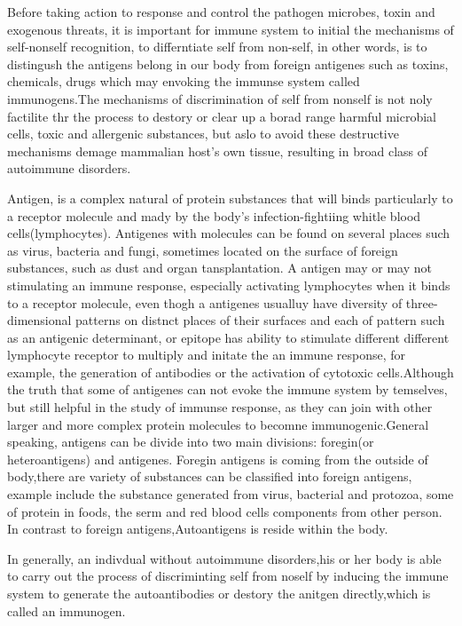 \documentclass[12pt]{article}
\begin{document}
Before taking action to response and control the pathogen microbes, toxin and exogenous threats, it is important for immune system to initial the mechanisms of self-nonself recognition, to differntiate self from non-self, in other words, is to distingush the antigens belong in our body from foreign antigenes such as toxins, chemicals, drugs which may envoking the immunse system called immunogens.The mechanisms of discrimination of self from nonself is not noly factilite thr the process to destory  or clear up a borad range harmful microbial cells, toxic and allergenic substances, but aslo to avoid these destructive mechanisms demage mammalian host's own tissue, resulting in broad class of autoimmune disorders.\medskip


Antigen, is a complex natural of protein substances that will binds particularly to a receptor molecule and mady by the body's infection-fightiing whitle blood cells(lymphocytes). Antigenes with molecules can be found on several places such as virus, bacteria and fungi, sometimes located on the surface of foreign substances, such as dust and organ tansplantation. A antigen may or may not stimulating an immune response, especially activating lymphocytes when it binds to a receptor molecule, even thogh a antigenes usualluy have diversity of three-dimensional patterns on distnct places of  their surfaces and each of pattern such as an antigenic determinant, or epitope has ability to stimulate different different lymphocyte receptor to  multiply and initate the an immune response, for example, the generation of antibodies or the activation of cytotoxic cells.Although the truth that some of antigenes can not evoke the immune system by temselves, but still helpful in the study of immunse response, as they can join with other larger and more complex  protein molecules to becomne immunogenic.General speaking, antigens can be divide into two main divisions: foregin(or heteroantigens) and antigenes.
Foregin antigens is coming from the outside of body,there are variety of substances can be classified into foreign antigens, example include the substance generated from virus, bacterial and protozoa, some of protein in foods, the serm and red blood cells components from other person. In contrast to foreign antigens,Autoantigens is reside within the body.\medskip

In generally, an indivdual without autoimmune disorders,his or her body is able to carry out the process of discriminting self from noself by inducing the immune system to generate the autoantibodies or destory the anitgen directly,which is called an immunogen.
\end{document}

